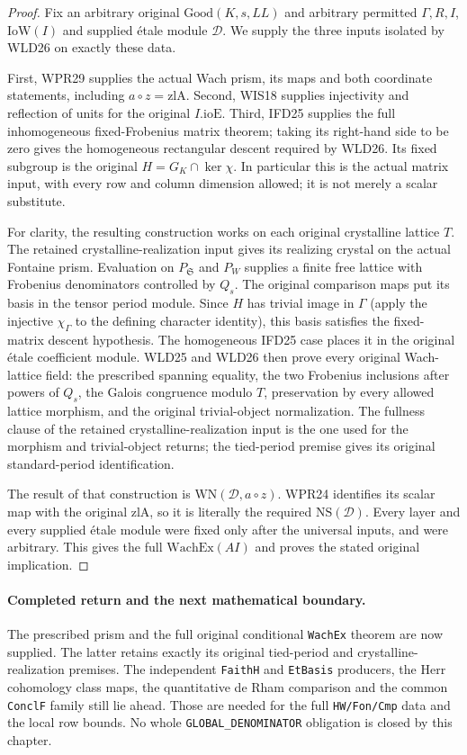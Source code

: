 \begin{proof}
Fix an arbitrary original $\mathrm{Good}(K,s,LL)$ and arbitrary
permitted $\Gamma,R,I$, $\mathrm{IoW}(I)$ and supplied \'etale
module $\mathcal D$. We supply the three inputs isolated by
WLD26 on exactly these data.

First, WPR29 supplies the actual Wach prism, its maps and
both coordinate statements, including $a\circ z=\mathrm{zlA}$.
Second, WIS18 supplies injectivity and reflection of units
for the original $I.\mathrm{ioE}$. Third, IFD25 supplies the
full inhomogeneous fixed-Frobenius matrix theorem; taking its
right-hand side to be zero gives the homogeneous rectangular
descent required by WLD26. Its fixed subgroup is the original
$H=G_K\cap\ker\chi$. In particular this is the actual matrix
input, with every row and column dimension allowed; it is not
merely a scalar substitute.

For clarity, the resulting construction works on each original
crystalline lattice $T$. The retained crystalline-realization
input gives its realizing crystal on the actual Fontaine prism.
Evaluation on $P_{\mathfrak S}$ and $P_W$ supplies a finite
free lattice with Frobenius denominators controlled by $Q_s$.
The original comparison maps put its basis in the tensor period
module. Since $H$ has trivial image in $\Gamma$ (apply the
injective $\chi_\Gamma$ to the defining character identity),
this basis satisfies the fixed-matrix descent hypothesis. The
homogeneous IFD25 case places it in the original \'etale
coefficient module. WLD25 and WLD26 then prove every original
Wach-lattice field: the prescribed spanning equality, the two
Frobenius inclusions after powers of $Q_s$, the Galois
congruence modulo $T$, preservation by every allowed lattice
morphism, and the original trivial-object normalization. The
fullness clause of the retained crystalline-realization input
is the one used for the morphism and trivial-object returns;
the tied-period premise gives its original standard-period
identification.

The result of that construction is $\mathrm{WN}(\mathcal D,a\circ z)$.
WPR24 identifies its scalar map with the original $\mathrm{zlA}$,
so it is literally the required $\mathrm{NS}(\mathcal D)$.
Every layer and every supplied \'etale module were fixed only
after the universal inputs, and were arbitrary. This gives
the full $\mathrm{WachEx}(AI)$ and proves the stated original
implication.
\end{proof}

\paragraph{Completed return and the next mathematical boundary.}
The prescribed prism and the full original conditional
\texttt{WachEx} theorem are now supplied. The latter retains
exactly its original tied-period and crystalline-realization
premises. The independent \texttt{FaithH} and \texttt{EtBasis}
producers, the Herr cohomology class maps, the quantitative
de Rham comparison and the common \texttt{ConclF} family still
lie ahead. Those are needed for the full \texttt{HW/Fon/Cmp}
data and the local row bounds. No whole
\texttt{GLOBAL\_\allowbreak DENOMINATOR} obligation is closed
by this chapter.

